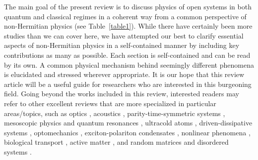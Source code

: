 \documentclass{tADP2e}
\theoremstyle{plain}
\theoremstyle{plain}
\theoremstyle{definition}
\begin{document}
The main goal of the present review is to discuss physics of open systems in both quantum and classical regimes in a coherent way from a common perspective of non-Hermitian physics (see Table~\ref{table1}). While there have certainly been more studies than we can cover here, we have attempted our best to clarify essential aspects of non-Hermitian physics in a self-contained manner by including key contributions as many as possible. Each section is self-contained and can be read by its own. A common physical mechanism behind seemingly different phenomena is elucidated and stressed wherever appropriate. It is our hope that this review article will be a useful guide for researchers who are interested in this burgeoning field. Going beyond the works included in this review, interested readers may refer to other excellent reviews that are more specialized in particular areas/topics, such as optics \cite{MH17,EG18,Mirieaar7709}, acoustics \cite{Mae1501595,CSA16,FZN19}, parity-time-symmetric systems \cite{CMB07rev,PD07,SKO19},    mesoscopic physics and quantum resonances \cite{NM98,JGM04,CH15,RS17}, 
ultracold atoms \cite{DAJ14,KS16}, driven-dissipative systems  \cite{DH10,MM12,RH13,Sieberer_2016,WH19}, optomechanics \cite{AM14}, exciton-polariton condensates \cite{CI13,Schneider_2016}, nonlinear phenomena \cite{KVV16}, biological transport \cite{Chou_2011},  active matter \cite{Marchetti2013}, and random matrices and disordered systems \cite{BCWJ97,Fyodorov_2003,MGE10}. 
\end{document}
